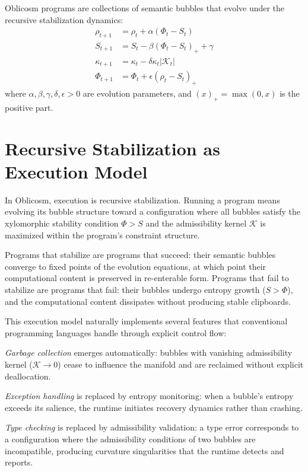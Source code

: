 \documentclass[12pt,oneside]{book}
\theoremstyle{plain}
\theoremstyle{definition}
\theoremstyle{plain}
\begin{document}
Oblicosm programs are collections of semantic bubbles that evolve under the recursive stabilization dynamics:
\begin{align}
\rho_{t+1} &= \rho_t + \alpha(\Phi_t - S_t) \\
S_{t+1} &= S_t - \beta(\Phi_t - S_t)_+ + \gamma \\
\kappa_{t+1} &= \kappa_t - \delta \kappa_t |\mathcal{K}_t| \\
\Phi_{t+1} &= \Phi_t + \epsilon(\rho_t - S_t)_+
\end{align}
where $\alpha, \beta, \gamma, \delta, \epsilon > 0$ are evolution parameters, and $(x)_+ = \max(0,x)$ is the positive part.

\section{Recursive Stabilization as Execution Model}

In Oblicosm, execution is recursive stabilization. Running a program means evolving its bubble structure toward a configuration where all bubbles satisfy the xylomorphic stability condition $\Phi > S$ and the admissibility kernel $\mathcal{K}$ is maximized within the program's constraint structure.

Programs that stabilize are programs that succeed: their semantic bubbles converge to fixed points of the evolution equations, at which point their computational content is preserved in re-enterable form. Programs that fail to stabilize are programs that fail: their bubbles undergo entropy growth ($S > \Phi$), and the computational content dissipates without producing stable clipboards.

This execution model naturally implements several features that conventional programming languages handle through explicit control flow:

\emph{Garbage collection} emerges automatically: bubbles with vanishing admissibility kernel ($\mathcal{K} \to 0$) cease to influence the manifold and are reclaimed without explicit deallocation.

\emph{Exception handling} is replaced by entropy monitoring: when a bubble's entropy exceeds its salience, the runtime initiates recovery dynamics rather than crashing.

\emph{Type checking} is replaced by admissibility validation: a type error corresponds to a configuration where the admissibility conditions of two bubbles are incompatible, producing curvature singularities that the runtime detects and reports.
\end{document}
